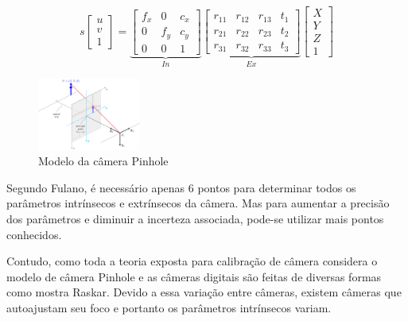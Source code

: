 \begin{equation}
\label{eq:matrizes}
s
\begin{bmatrix}
u \\
v \\
1
\end{bmatrix}
=
\underbrace{
\begin{bmatrix}
f_x & 0 & c_x \\
0 & f_y & c_y \\
0 & 0 & 1
\end{bmatrix}}_{In}
\underbrace{
\begin{bmatrix}
r_{11} & r_{12} & r_{13} & t_{1} \\
r_{21} & r_{22} & r_{23} & t_{2} \\
r_{31} & r_{32} & r_{33} & t_{3}
\end{bmatrix}}_{Ex}
\begin{bmatrix}
X \\
Y \\
Z \\
1
\end{bmatrix}
\end{equation} 

\begin{figure}[!ht]
\centering
\label{fig:PinholeCamera}
\includegraphics[width=0.3\textwidth]{img/PinholeCameraModel.png}
\caption{Modelo da câmera Pinhole}
\end{figure}

Segundo Fulano, é necessário apenas 6 pontos para determinar todos os parâmetros intrínsecos e extrínsecos da câmera. Mas para aumentar a precisão dos parâmetros e diminuir a incerteza associada, pode-se utilizar mais pontos conhecidos. %

Contudo, como toda a teoria exposta para calibração de câmera considera o modelo de câmera Pinhole e as câmeras digitais são feitas de diversas formas como mostra Raskar\cite{raskar}. Devido a essa variação entre câmeras, existem câmeras que autoajustam seu foco e portanto os parâmetros intrínsecos variam.